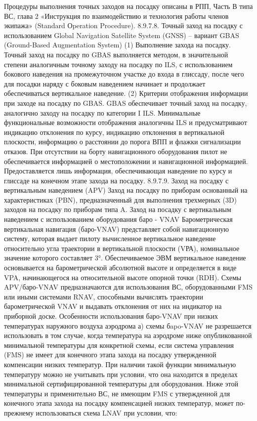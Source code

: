 Процедуры выполнения точных заходов на посадку описаны в РПП, Часть В типа ВС, глава 2 «Инструкция по взаимодействию и технология работы членов экипажа» (Standard Оperation Procedure).
8.9.7.8.	Точный заход на посадку с использованием Global Navigation Satellite System 
(GNSS) – вариант GBAS (Ground-Based Augmentation System)
(1) Выполнение захода на посадку.
Точный заход на посадку по GBAS выполняется методом, в значительной степени аналогичным точному заходу на посадку по ILS, с использованием бокового наведения на промежуточном участке до входа в глиссаду, после чего для посадки наряду с боковым наведением начинает и продолжает обеспечиваться вертикальное наведение.
(2) Критерии отображения информации при заходе на посадку по GBAS.
GBAS обеспечивает точный заход на посадку, аналогично заходу на посадку по категории I ILS.
Минимальные функциональные возможности отображения аналогичны ILS и предусматривают индикацию отклонения по курсу, индикацию отклонения в вертикальной плоскости, информацию о расстоянии до порога ВПП и флажки сигнализации отказов. При отсутствии на борту навигационного оборудования пилот не обеспечивается информацией о местоположении и навигационной информацией. Предоставляется лишь информация, обеспечивающая наведение по курсу и глиссаде на конечном этапе захода на посадку.
8.9.7.9.	Заход на посадку с вертикальным наведением (APV) 
Заход на посадку по приборам основанный на характеристиках (PBN), предназначенный для выполнения трехмерных (3D) заходов на посадку по приборам типа A.
Заход на посадку с вертикальным наведением с использованием оборудования баро - VNAV
Барометрическая вертикальная навигация (баро-VNAV) представляет собой навигационную систему, которая выдает пилоту вычисленное вертикальное наведение относительно угла траектории в вертикальной плоскости (VРА), номинальное значение которого составляет 3°.
Обеспечиваемое ЭВМ вертикальное наведение основывается на барометрической абсолютной высоте и определяется в виде VPA, начинающегося на относительной высоте опорной точки (RDH).
Схемы APV/баро-VNAV предназначаются для использования ВС, оборудованными FMS или иными системами RNAV, способными вычислять траектории барометрической VNAV и выдавать отклонения от них на индикатор на приборной доске.
Особенности использования баро-VNAV при низких температурах наружного воздуха аэродрома
а)	схемы бapo-VNAV не разрешается использовать в том случае, когда температура на аэродроме ниже опубликованной минимальной температуры для конкретной схемы, если система управления (FMS) не имеет для конечного этапа захода на посадку утвержденной компенсации низких температур. При наличии такой функции минимальную температуру можно не учитывать при условии, что она находится в пределах минимальной сертифицированной температуры для оборудования. Ниже этой температуры и применительно ВС, не имеющим FMS с утвержденной для конечного этапа захода на посадку компенсацией низких температур, может по-прежнему использоваться схема LNAV при условии, что:
